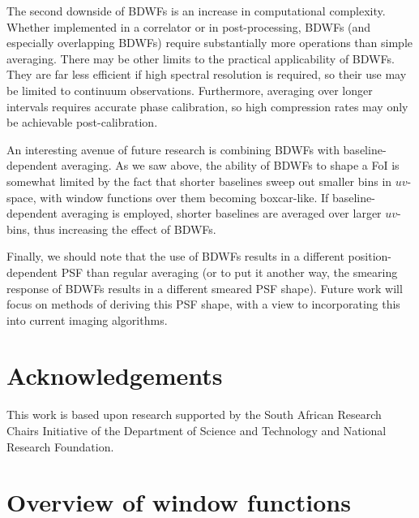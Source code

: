 \documentclass[useAMS,usenatbib]{mn2e}
\newcommand{\ATM}[1]{\textcolor{blue}{{\bf Marcellin: #1}}}
\newcommand{\GSF}[1]{\textcolor{red}{{\bf GSF: #1}}}
\begin{document}
The second downside of BDWFs is an increase in computational complexity. Whether implemented in a correlator
or in post-processing, BDWFs (and especially overlapping BDWFs) require substantially more operations than simple averaging.
There may be other limits to the practical applicability of BDWFs. They are far less efficient if high spectral  
resolution is required, so their use may be limited to continuum observations. Furthermore, averaging over longer 
intervals requires accurate phase calibration, so high compression rates may only be achievable post-calibration.

An interesting avenue of future research is combining BDWFs with baseline-dependent averaging. As we saw above, the ability
of BDWFs to shape a FoI is somewhat limited by the fact that shorter baselines sweep out smaller bins in $uv$-space, with 
window functions over them becoming boxcar-like. If baseline-dependent averaging is employed, shorter baselines are averaged over
larger $uv$-bins, thus increasing the effect of BDWFs. 

Finally, we should note that the use of BDWFs results in a different position-dependent PSF than regular averaging (or
to put it another way, the smearing response of BDWFs results in a different smeared PSF shape). Future work will focus
on methods of deriving this PSF shape, with a view to incorporating this into current imaging algorithms.


\section*{Acknowledgements}

This work is based upon research supported by the South African Research Chairs Initiative of the Department of 
Science and Technology and National Research Foundation.





\appendix
\section{Overview of window functions}
\label{appendixA}
\newcommand{\FilterFigure}[4]{
\begin{figure}
\texttt{[image: \#1]}%
\texttt{[image: \#2]}
\caption{#3}\label{#4}
\end{figure}
}

\end{document}
